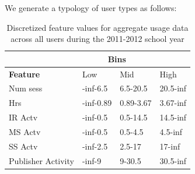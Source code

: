 \documentclass{acm_proc_article-sp}
\begin{document}
We generate a typology of user types as follows:

\begin{table}
\caption{Discretized feature values for aggregate usage data across all users during the 2011-2012 school year}
\label{aggfeaturebins}
\begin{tabular}{|l|l|l|l|} \\ \hline
& \multicolumn{2}{c}{\textbf{Bins}}  \\ \hline
\textbf{Feature} & Low & Mid & High \\ \hline
Num sess & -inf-6.5 & 6.5-20.5 & 20.5-inf \\ \hline
Hrs & -inf-0.89 &0.89-3.67 & 3.67-inf \\ \hline
IR Actv & -inf-0.5 & 0.5-14.5 & 14.5-inf \\ \hline
MS Actv & -inf-0.5 & 0.5-4.5 & 4.5-inf \\ \hline
SS Actv & -inf-2.5 & 2.5-17 & 17-inf \\ \hline
Publisher Activity & -inf-9 & 9-30.5 & 30.5-inf \\ \hline
\end{tabular}
\end{table}
\end{document}
